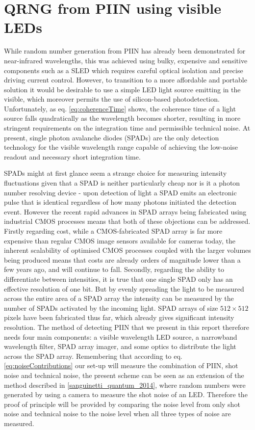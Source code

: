 \documentclass[]{article}
\begin{document}
\section{QRNG from PIIN using visible LEDs}
	While random number generation from PIIN has already been demonstrated for near-infrared wavelengths, this was achieved using bulky, expensive and sensitive components such as a SLED which requires careful optical isolation and precise driving current control. However, to transition to a more affordable and portable solution it would be desirable to use a simple LED light source emitting in the visible, which moreover permits the use of silicon-based photodetection. Unfortunately, as eq. \ref{eq:coherenceTime} shows, the coherence time of a light source falls quadratically as the wavelength becomes shorter, resulting in more stringent requirements on the integration time and permissible technical noise. At present, single photon avalanche diodes (SPADs) are the only detection technology for the visible wavelength range capable of achieving the low-noise readout and necessary short integration time.

	SPADs might at first glance seem a strange choice for measuring intensity fluctuations given that a SPAD is neither particularly cheap nor is it a photon number resolving device - upon detection of light a SPAD emits an electronic pulse that is identical regardless of how many photons initiated the detection event. However the recent rapid advances in SPAD arrays being fabricated using industrial CMOS processes means that both of these objections can be addressed. Firstly regarding cost, while a CMOS-fabricated SPAD array is far more expensive than regular CMOS image sensors available for cameras today, the inherent scalability of optimised CMOS processes coupled with the larger volumes being produced means that costs are already orders of magnitude lower than a few years ago, and will continue to fall. Secondly, regarding the ability to differentiate between intensities, it is true that one single SPAD only has an effective resolution of one bit. But by evenly spreading the light to be measured across the entire area of a SPAD array the intensity can be measured by the number of SPADs activated by the incoming light. SPAD arrays of size $512\times 512$ pixels have been fabricated thus far, which already gives significant intensity resolution. The method of detecting PIIN that we present in this report therefore needs four main components: a visible wavelength LED source, a narrowband wavelength filter, SPAD array imager, and some optics to distribute the light across the SPAD array. Remembering that according to eq. \ref{eq:noiseContributions} our set-up will measure the combination of PIIN, shot noise and technical noise, the present scheme can be seen as an extension of the method described in \ref{sanguinetti_quantum_2014}, where random numbers were generated by using a camera to measure the shot noise of an LED. Therefore the proof of principle will be provided by comparing the noise level from only shot noise and technical noise to the noise level when all three types of noise are measured.




\end{document}
